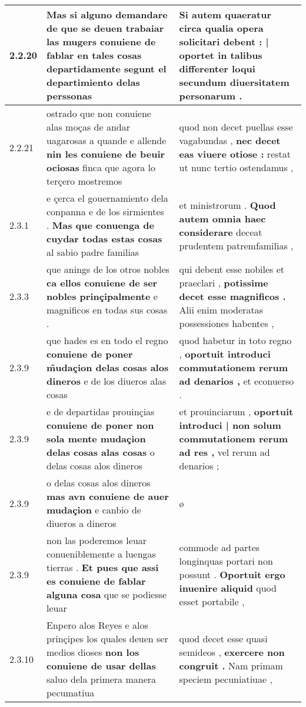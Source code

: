 \begin{tabular}{|p{1cm}|p{6.5cm}|p{6.5cm}|}
2.2.20 & Mas si alguno demandare \textbf{ de que se deuen trabaiar las mugers conuiene de fablar en tales cosas departidamente } segunt el departimiento delas perssonas & Si autem quaeratur \textbf{ circa qualia opera solicitari debent : | oportet in talibus differenter loqui } secundum diuersitatem personarum . \\\hline
2.2.21 & ostrado que non conuiene alas moças de andar uagarosas a quande e allende \textbf{ nin les conuiene de beuir ociosas } finca que agora lo terçero mostremos & quod non decet puellas esse vagabundas , \textbf{ nec decet eas viuere otiose : } restat ut nunc tertio ostendamus , \\\hline
2.3.1 & e çerca el gouernamiento dela conpanna e de los sirmientes . \textbf{ Mas que conuenga de cuydar todas estas cosas } al sabio padre familias & et ministrorum . \textbf{ Quod autem omnia haec considerare } deceat prudentem patremfamilias , \\\hline
2.3.3 & que anings de los otros nobles \textbf{ ca ellos conuiene de ser nobles prinçipalmente } e magnificos en todas sus cosas . & qui debent esse nobiles et praeclari , \textbf{ potissime decet esse magnificos . } Alii enim moderatas possessiones habentes , \\\hline
2.3.9 & que hades es en todo el regno \textbf{ conuiene de poner m̃udaçion delas cosas alos dineros } e de los diueros alas cosas & quod habetur in toto regno , \textbf{ oportuit introduci commutationem rerum ad denarios , } et econuerso . \\\hline
2.3.9 & e de departidas prouinçias \textbf{ conuiene de poner non sola mente mudaçion delas cosas alas cosas } o delas cosas alos dineros & et prouinciarum , \textbf{ oportuit introduci | non solum commutationem rerum ad res , } vel rerum ad denarios ; \\\hline
2.3.9 & o delas cosas alos dineros \textbf{ mas avn conuiene de auer mudaçion } e canbio de diueros a dineros & ø \\\hline
2.3.9 & non las poderemos leuar conueniblemente a luengas tierras . \textbf{ Et pues que assi es conuiene de fablar alguna cosa } que se podiesse leuar & commode ad partes longinquas portari non possunt . \textbf{ Oportuit ergo inuenire aliquid } quod esset portabile , \\\hline
2.3.10 & Enpero alos Reyes e alos prinçipes los quales deuen ser medios dioses \textbf{ non los conuiene de usar dellas } saluo dela primera manera pecumatiua & quod decet esse quasi semideos , \textbf{ exercere non congruit . } Nam primam speciem pecuniatiuae , \\\hline

\end{tabular}
